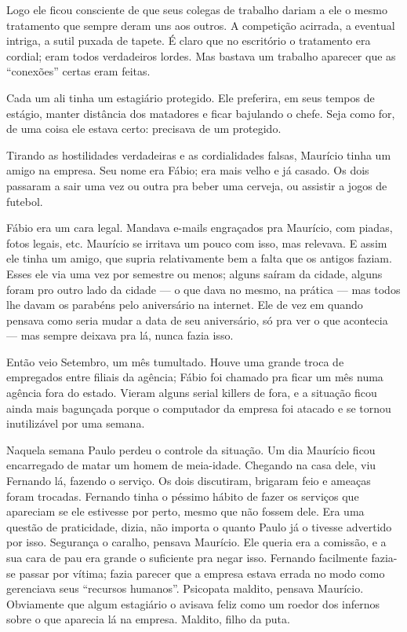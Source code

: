 Logo ele ficou consciente de que seus colegas de trabalho dariam a ele o mesmo tratamento que sempre deram uns aos outros. A competição acirrada, a eventual intriga, a sutil puxada de tapete. É claro que no escritório o tratamento era cordial; eram todos verdadeiros lordes. Mas bastava um trabalho aparecer que as “conexões” certas eram feitas.

Cada um ali tinha um estagiário protegido. Ele preferira, em seus tempos de estágio, manter distância dos matadores e ficar bajulando o chefe. Seja como for, de uma coisa ele estava certo: precisava de um protegido.

Tirando as hostilidades verdadeiras e as cordialidades falsas, Maurício tinha um amigo na empresa. Seu nome era Fábio; era mais velho e já casado. Os dois passaram a sair uma vez ou outra pra beber uma cerveja, ou assistir a jogos de futebol.

Fábio era um cara legal. Mandava e-mails engraçados pra Maurício, com piadas, fotos legais, etc. Maurício se irritava um pouco com isso, mas relevava. E assim ele tinha um amigo, que supria relativamente bem a falta que os antigos faziam. Esses ele via uma vez por semestre ou menos; alguns saíram da cidade, alguns foram pro outro lado da cidade --- o que dava no mesmo, na prática --- mas todos lhe davam os pa\-ra\-béns pelo aniversário na internet. Ele de vez em quando pensava como seria mudar a data de seu aniversário, só pra ver o que acontecia --- mas sempre deixava pra lá, nunca fazia isso.

Então veio Setembro, um mês tumultado. Houve uma gran\-de troca de empregados entre filiais da agência; Fábio foi chamado pra ficar um mês numa agência fora do estado. Vieram alguns serial killers de fora, e a situação ficou ainda mais bagunçada porque o computador da empresa foi atacado e se tornou inutilizável por uma semana.

Naquela semana Paulo perdeu o controle da situação. Um dia Maurício ficou encarregado de matar um homem de meia-idade. Chegando na casa dele, viu Fernando lá, fazendo o serviço. Os dois discutiram, brigaram feio e ameaças foram trocadas. Fernando tinha o péssimo hábito de fazer os serviços que apareciam se ele estivesse por perto, mesmo que não fossem dele. Era uma questão de praticidade, dizia, não importa o quanto Paulo já o tivesse advertido por isso. Segurança o caralho, pensava Maurício. Ele queria era a comissão, e a sua cara de pau era grande o suficiente pra negar isso. Fernando facilmente fazia-se passar por vítima; fazia parecer que a empresa estava errada no modo como gerenciava seus ``recursos humanos''. Psicopata maldito, pensava Maurício. Obviamente que algum estagiário o avisava feliz como um roedor dos infernos sobre o que aparecia lá na empresa. Maldito, filho da puta.

